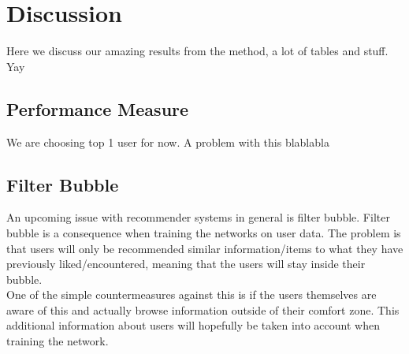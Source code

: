 \chapter{Discussion}

Here we discuss our amazing results from the method, a lot of tables and stuff. Yay


\section{Performance Measure}%
We are choosing top 1 user for now. A problem with this blablabla 


\section{Filter Bubble}
An upcoming issue with recommender systems in general is filter bubble.
Filter bubble is a consequence when training the networks on user data. The problem is that users will only be recommended similar information/items to what they have previously liked/encountered, meaning that the users will stay inside their bubble. \\
One of the simple countermeasures against this is if the users themselves are aware of this and actually browse information outside of their comfort zone. This additional information about users will hopefully be taken into account when training the network. \\

